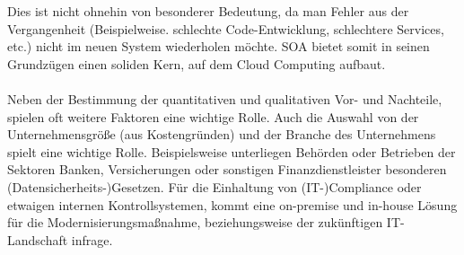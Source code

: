 Dies ist nicht ohnehin von besonderer Bedeutung, da man Fehler aus der Vergangenheit (Beispielweise. schlechte Code-Entwicklung, schlechtere Services, etc.) nicht im neuen System wiederholen möchte.  \acs{SOA} bietet somit in seinen Grundzügen einen soliden Kern, auf dem Cloud Computing aufbaut. 
\\\\
Neben der Bestimmung der quantitativen und qualitativen Vor- und Nachteile, spielen oft weitere Faktoren eine wichtige Rolle.  Auch die Auswahl von der Unternehmensgröße (aus Kostengründen) und der Branche des Unternehmens spielt eine wichtige Rolle. Beispielsweise unterliegen Behörden oder Betrieben der Sektoren Banken, Versicherungen oder sonstigen Finanzdienstleister besonderen (Datensicherheits-)Gesetzen. Für die Einhaltung von (IT-)Compliance oder etwaigen internen Kontrollsystemen, kommt eine on-premise und in-house Lösung für die Modernisierungsmaßnahme, beziehungsweise der zukünftigen IT-Landschaft infrage. \cite{falk2012compliance}\newpage
